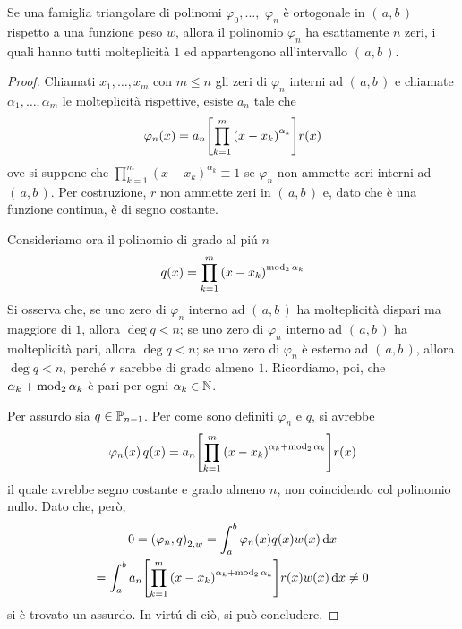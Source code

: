 	\begin{teorema}[Christoffel]
		Se una famiglia triangolare di polinomi \(\varphi_0, \dots,\) \(\varphi_n\) è ortogonale in \((\, a, b \,)\) rispetto a una funzione peso \(w\), allora il polinomio \(\varphi_n\) ha esattamente \(n\) zeri, i quali hanno tutti molteplicità \(1\) ed appartengono all'intervallo \((\, a, b \,)\).
	\end{teorema}

	\begin{proof}
		Chiamati \(x_1, \dots, x_m\) con \(m \le n\) gli zeri di \(\varphi_n\) interni ad \((\, a, b \,)\) e chiamate \(\alpha_1, \dots, \alpha_m\) le molteplicità rispettive, esiste \(a_n\) tale che
		\begin{equation*}
			\varphi_n (x) = a_n \qty[\prod_{k = 1}^m \qty(x - x_k)^{\alpha_k}] r (x)
		\end{equation*}
		ove si suppone che \(\prod_{k = 1}^m (x - x_k)^{\alpha_k} \equiv 1\) se \(\varphi_n\) non ammette zeri interni ad \((\, a, b \,)\). Per costruzione, \(r\) non ammette zeri in \((\, a, b \,)\) e, dato che è una funzione continua, è di segno costante.
		
		Consideriamo ora il polinomio di grado al piú \(n\)
		\begin{equation*}
			q (x) = \prod_{k = 1}^m \qty(x - x_k)^{\varmod_2 \alpha_k}
		\end{equation*}
		Si osserva che, se uno zero di \(\varphi_n\) interno ad \((\, a, b \,)\) ha molteplicità dispari ma maggiore di \(1\), allora \(\deg q < n\); se uno zero di \(\varphi_n\) interno ad \((\, a, b \,)\) ha molteplicità pari, allora \(\deg q < n\); se uno zero di \(\varphi_n\) è esterno ad \((\, a, b \,)\), allora \(\deg q < n\), perché \(r\) sarebbe di grado almeno \(1\). Ricordiamo, poi, che \(\alpha_k + \varmod_2 \alpha_k\) è pari per ogni \(\alpha_k \in \N\).
		
		Per assurdo sia \(q \in \P_{n - 1}\). Per come sono definiti \(\varphi_n\) e \(q\), si avrebbe
		\begin{equation*}
			\varphi_n (x) \, q(x) = a_n \qty[\prod_{k = 1}^m \qty(x - x_k)^{\alpha_k + \varmod_2 \alpha_k}] r (x)
		\end{equation*}
		il quale avrebbe segno costante e grado almeno \(n\), non coincidendo col polinomio nullo. Dato che, però,
		\begin{multline*}
			0 = \qty(\varphi_n, q)_{2, w} = \int_a^b \varphi_n (x) q (x) w (x) \dd{x} \\
			= \int_a^b a_n \qty[\prod_{k = 1}^m \qty(x - x_k)^{\alpha_k + \varmod_2 \alpha_k}] r (x) w (x) \dd{x} \ne 0
		\end{multline*}
		si è trovato un assurdo. In virtú di ciò, si può concludere.
	\end{proof}

